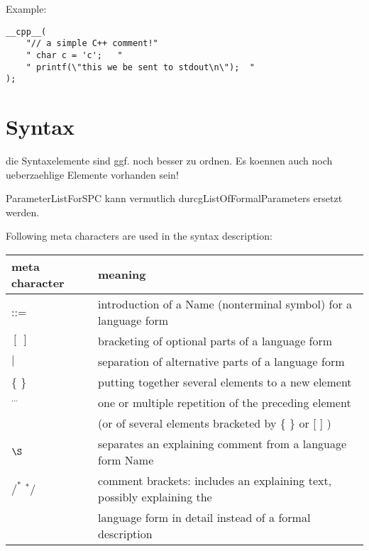 Example:
\begin{lstlisting}
__cpp__(	
    "// a simple C++ comment!"
    " char c = 'c';   " 
    " printf(\"this we be sent to stdout\n\");  " 
);
\end{lstlisting}


\newpage
\section{Syntax}    %
\begin{discuss}
die Syntaxelemente sind ggf. noch besser zu ordnen.
Es koennen auch noch ueberzaehlige Elemente vorhanden sein!

ParameterListForSPC kann vermutlich durcgListOfFormalParameters ersetzt 
werden.


\end{discuss}

Following meta characters are used in the syntax description:\\ 

\begin{tabular}{ll}
meta character & meaning \\ \hline
::=            & introduction of a Name (nonterminal symbol) for a language form\\
$[\ ]$         & bracketing of optional parts of a language form \\ 
$\mid$         & separation of alternative parts of a language form\\
\{ \}          & putting together several elements to a new element\\
$^{...}$       & one or multiple repetition of the preceding element\\
               & (or of several elements bracketed by \{ \} or [ ] ) \\
$\S $          & separates an explaining comment from a language form Name\\
$/^*$ $^*/$    & comment brackets: 
                 includes an explaining text, possibly explaining the\\
               & language form in detail instead of a formal description\\
\end{tabular}

